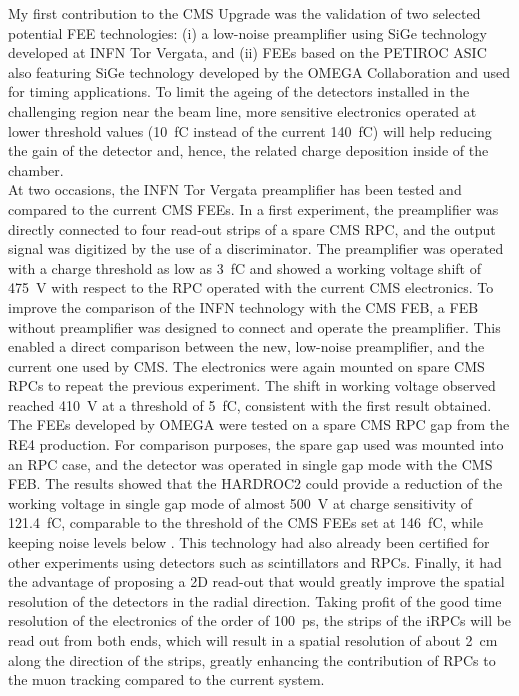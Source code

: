 	My first contribution to the CMS Upgrade was the validation of two selected potential FEE technologies: (i) a low-noise preamplifier using SiGe technology developed at INFN Tor Vergata, and (ii) FEEs based on the PETIROC ASIC also featuring SiGe technology developed by the OMEGA Collaboration and used for timing applications. To limit the ageing of the detectors installed in the challenging region near the beam line, more sensitive electronics operated at lower threshold values (\SI{10}{fC} instead of the current \SI{140}{fC}) will help reducing the gain of the detector and, hence, the related charge deposition inside of the chamber.\\
	At two occasions, the INFN Tor Vergata preamplifier has been tested and compared to the current CMS FEEs. In a first experiment, the preamplifier was directly connected to four read-out strips of a spare CMS RPC, and the output signal was digitized by the use of a discriminator. The preamplifier was operated with a charge threshold as low as \SI{3}{fC} and showed a working voltage shift of \SI{475}{V} with respect to the RPC operated with the current CMS electronics. To improve the comparison of the INFN technology with the CMS FEB, a FEB without preamplifier was designed to connect and operate the preamplifier. This enabled a direct comparison between the new, low-noise preamplifier, and the current one used by CMS. The electronics were again mounted on spare CMS RPCs to repeat the previous experiment. The shift in working voltage observed reached \SI{410}{V} at a threshold of \SI{5}{fC}, consistent with the first result obtained.\\
	The FEEs developed by OMEGA were tested on a spare CMS RPC gap from the RE4 production. For comparison purposes, the spare gap used was mounted into an RPC case, and the detector was operated in single gap mode with the CMS FEB. The results showed that the HARDROC2 could provide a reduction of the working voltage in single gap mode of almost \SI{500}{V} at charge sensitivity of \SI{121.4}{fC}, comparable to the threshold of the CMS FEEs set at \SI{146}{fC}, while keeping noise levels below . This technology had also already been certified for other experiments using detectors such as scintillators and RPCs. Finally, it had the advantage of proposing a 2D read-out that would greatly improve the spatial resolution of the detectors in the radial direction. Taking profit of the good time resolution of the electronics of the order of \SI{100}{ps}, the strips of the iRPCs will be read out from both ends, which will result in a spatial resolution of about \SI{2}{cm} along the direction of the strips, greatly enhancing the contribution of RPCs to the muon tracking compared to the current system.\\
